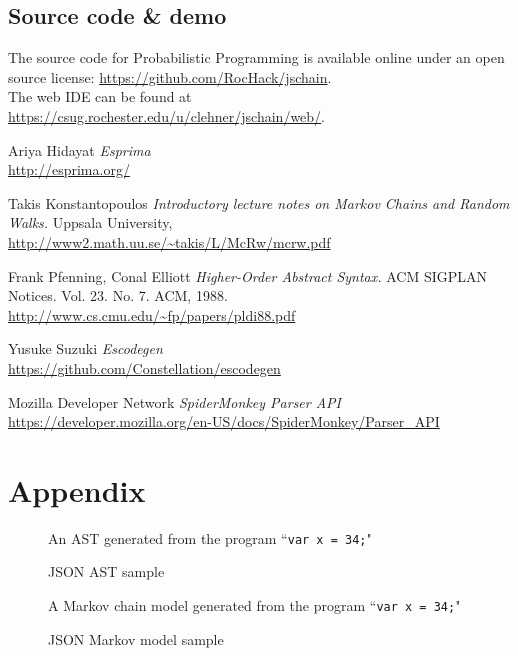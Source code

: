 \documentclass[titlepage]{article}
\begin{document}

\subsection*{Source code \& demo}

The source code for Probabilistic Programming is available online under an open
source license:
\url{https://github.com/RocHack/jschain}.\\

\noindent The web IDE can be found at
\url{https://csug.rochester.edu/u/clehner/jschain/web/}.

\clearpage

\begin{thebibliography}{1}

	 Ariya Hidayat {\em Esprima}
		\\\url{http://esprima.org/}

	 Takis Konstantopoulos {\em Introductory lecture notes on
		Markov Chains and Random Walks.} Uppsala University,
		\\\url{http://www2.math.uu.se/~takis/L/McRw/mcrw.pdf}

	 Frank Pfenning, Conal Elliott
		{\em Higher-Order Abstract Syntax.}
		ACM SIGPLAN Notices. Vol. 23. No. 7. ACM, 1988.
		\\\url{http://www.cs.cmu.edu/~fp/papers/pldi88.pdf}

	 Yusuke Suzuki {\em Escodegen}
		\\\url{https://github.com/Constellation/escodegen}

	 Mozilla Developer Network {\em SpiderMonkey Parser API}
		\\\url{https://developer.mozilla.org/en-US/docs/SpiderMonkey/Parser_API}

\end{thebibliography}

\clearpage
\section*{Appendix}

\begin{figure}[h!]
	\caption{JSON AST sample}
	\label{fig:sample-ast}
	\centering
    \vspace{-8pt}
	An AST generated from the program ``{\tt var x = 34;}"

	
\end{figure}

\begin{figure}[h!]
	\caption{JSON Markov model sample}
	\label{fig:sample-model}
	\centering
    \vspace{-8pt}
	A Markov chain model generated from the program ``{\tt var x = 34;}"

	
\end{figure}
\end{document}
